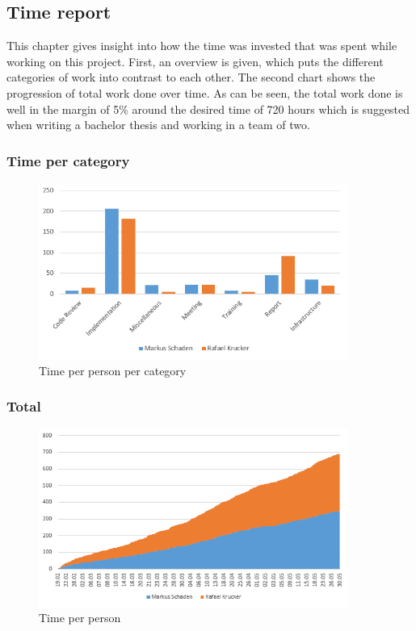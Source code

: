 \subsection{Time report}
This chapter gives insight into how the time was invested that was spent while working on this project. First, an overview is given, which puts the different categories of work into contrast to each other. The second chart shows the progression of total work done over time. As can be seen, the total work done is well in the margin of 5\% around the desired time of 720 hours which is suggested when writing a bachelor thesis and working in a team of two. 
\subsubsection{Time per category}
\begin{figure}[H]
	\centering
	\includegraphics[width=0.9\textwidth]{img/timereport_epics}
	\caption{Time per person per category}
	\label{fig:timereport_epics}
\end{figure}

\subsubsection{Total}
\begin{figure}[H]
	\centering
	\includegraphics[width=0.9\textwidth]{img/timereport_total}
	\caption{Time per person}
	\label{fig:timereport_total}
\end{figure}
